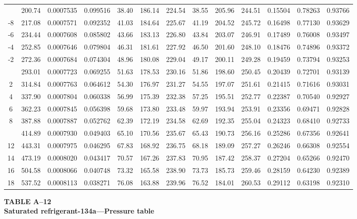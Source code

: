 \documentclass[12pt,a3paper]{article}
\begin{document}
\begin{enumerate}
\begin{center}
\begin{longtable}{c c c c c c c c c c c c c}
\addlinespace
-10 & 200.74 & 0.0007535 & 0.099516 & 38.40 & 186.14 & 224.54 & 38.55 & 205.96 & 244.51 & 0.15504 & 0.78263 & 0.93766 \\
-8 & 217.08 & 0.0007571 & 0.092352 & 41.03 & 184.64 & 225.67 & 41.19 & 204.52 & 245.72 & 0.16498 & 0.77130 & 0.93629 \\
-6 & 234.44 & 0.0007608 & 0.085802 & 43.66 & 183.13 & 226.80 & 43.84 & 203.07 & 246.91 & 0.17489 & 0.76008 & 0.93497 \\
-4 & 252.85 & 0.0007646 & 0.079804 & 46.31 & 181.61 & 227.92 & 46.50 & 201.60 & 248.10 & 0.18476 & 0.74896 & 0.93372 \\
-2 & 272.36 & 0.0007684 & 0.074304 & 48.96 & 180.08 & 229.04 & 49.17 & 200.11 & 249.28 & 0.19459 & 0.73794 & 0.93253 \\
\addlinespace
0 & 293.01 & 0.0007723 & 0.069255 & 51.63 & 178.53 & 230.16 & 51.86 & 198.60 & 250.45 & 0.20439 & 0.72701 & 0.93139 \\
2 & 314.84 & 0.0007763 & 0.064612 & 54.30 & 176.97 & 231.27 & 54.55 & 197.07 & 251.61 & 0.21415 & 0.71616 & 0.93031 \\
4 & 337.90 & 0.0007804 & 0.060338 & 56.99 & 175.39 & 232.38 & 57.25 & 195.51 & 252.77 & 0.22387 & 0.70540 & 0.92927 \\
6 & 362.23 & 0.0007845 & 0.056398 & 59.68 & 173.80 & 233.48 & 59.97 & 193.94 & 253.91 & 0.23356 & 0.69471 & 0.92828 \\
8 & 387.88 & 0.0007887 & 0.052762 & 62.39 & 172.19 & 234.58 & 62.69 & 192.35 & 255.04 & 0.24323 & 0.68410 & 0.92733 \\
\addlinespace
10 & 414.89 & 0.0007930 & 0.049403 & 65.10 & 170.56 & 235.67 & 65.43 & 190.73 & 256.16 & 0.25286 & 0.67356 & 0.92641 \\
12 & 443.31 & 0.0007975 & 0.046295 & 67.83 & 168.92 & 236.75 & 68.18 & 189.09 & 257.27 & 0.26246 & 0.66308 & 0.92554 \\
14 & 473.19 & 0.0008020 & 0.043417 & 70.57 & 167.26 & 237.83 & 70.95 & 187.42 & 258.37 & 0.27204 & 0.65266 & 0.92470 \\
16 & 504.58 & 0.0008066 & 0.040748 & 73.32 & 165.58 & 238.90 & 73.73 & 185.73 & 259.46 & 0.28159 & 0.64230 & 0.92389 \\
18 & 537.52 & 0.0008113 & 0.038271 & 76.08 & 163.88 & 239.96 & 76.52 & 184.01 & 260.53 & 0.29112 & 0.63198 & 0.92310 \\
\end{longtable}
\end{center}

\noindent\textbf{\Large TABLE A--12} \\
\noindent\textbf{\large Saturated refrigerant-134a---Pressure table}
\vspace{0.3cm}


\end{enumerate}
\end{document}
